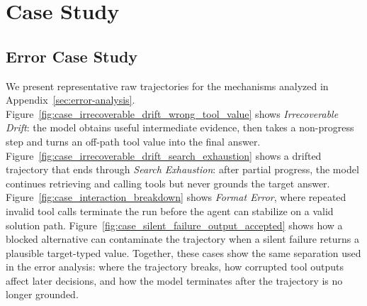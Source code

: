 \documentclass{llmxive}
\begin{document}

\section{Case Study}
\label{app:case-study}



\subsection{Error Case Study}

We present representative raw trajectories for the mechanisms analyzed in Appendix~\ref{sec:error-analysis}. 
Figure~\ref{fig:case_irrecoverable_drift_wrong_tool_value} shows \textit{Irrecoverable Drift}: the model obtains useful intermediate evidence, then takes a non-progress step and turns an off-path tool value into the final answer. 
Figure~\ref{fig:case_irrecoverable_drift_search_exhaustion} shows a drifted trajectory that ends through \emph{Search Exhaustion}: after partial progress, the model continues retrieving and calling tools but never grounds the target answer. 
Figure~\ref{fig:case_interaction_breakdown} shows \textit{Format Error}, where repeated invalid tool calls terminate the run before the agent can stabilize on a valid solution path. 
Figure~\ref{fig:case_silent_failure_output_accepted} shows how a blocked alternative can contaminate the trajectory when a silent failure returns a plausible target-typed value. 
Together, these cases show the same separation used in the error analysis: where the trajectory breaks, how corrupted tool outputs affect later decisions, and how the model terminates after the trajectory is no longer grounded.
\end{document}
